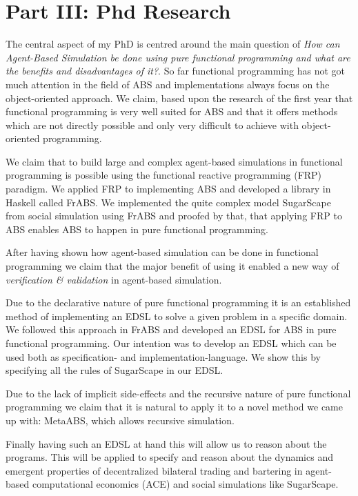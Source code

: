 \section{Part III: Phd Research} 
The central aspect of my PhD is centred around the main question of \textit{How can Agent-Based Simulation be done using pure functional programming and what are the benefits and disadvantages of it?}. So far functional programming has not got much attention in the field of ABS and implementations always focus on the object-oriented approach. We claim, based upon the research of the first year that functional programming is very well suited for ABS and that it offers methods which are not directly possible and only very difficult to achieve with object-oriented programming. 

We claim that to build large and complex agent-based simulations in functional programming is possible using the functional reactive programming (FRP) paradigm. We applied FRP to implementing ABS and developed a library in Haskell called FrABS. We implemented the quite complex model SugarScape from social simulation using FrABS and proofed by that, that applying FRP to ABS enables ABS to happen in pure functional programming.

After having shown how agent-based simulation can be done in functional programming we claim that the major benefit of using it enabled a new way of \textit{verification \& validation} in agent-based simulation. 

Due to the declarative nature of pure functional programming it is an established method of implementing an EDSL to solve a given problem in a specific domain. We followed this approach in FrABS and developed an EDSL for ABS in pure functional programming. Our intention was to develop an EDSL which can be used both as specification- and implementation-language. We show this by specifying all the rules of SugarScape in our EDSL.

Due to the lack of implicit side-effects and the recursive nature of pure functional programming we claim that it is natural to apply it to a novel method we came up with: MetaABS, which allows recursive simulation.

Finally having such an EDSL at hand this will allow us to reason about the programs. This will be applied to specify and reason about the dynamics and emergent properties of decentralized bilateral trading and bartering in agent-based computational economics (ACE) and social simulations like SugarScape.

